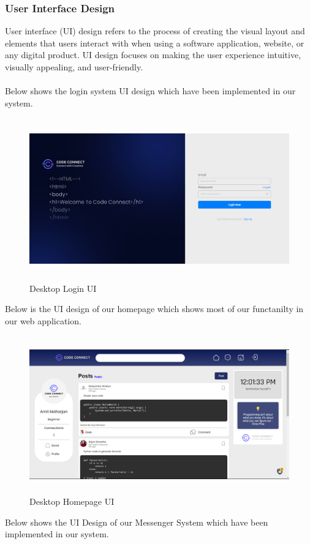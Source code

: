 \subsubsection{User Interface Design}
User interface (UI) design refers to the process of creating the visual layout and elements that users interact with when using a software application, website, or any digital product. UI design focuses on making the user experience intuitive, visually appealing, and user-friendly. 
\\\\
Below shows the login system UI design which have been implemented in our system.
\begin{figure}[H]
    \centering
    \includegraphics[height = 7cm]{ui_diagrams/desktop_login.png}
    \caption{Desktop Login UI}
\end{figure}
Below is the UI design of our homepage which shows most of our functanilty in our web application.
\begin{figure}[H]
  \centering
  \includegraphics[height = 6.8cm]{Outcome-ss/homepage.png}
  \caption{Desktop Homepage UI}
\end{figure}
Below shows the UI Design of our Messenger System which have been implemented in our system.
